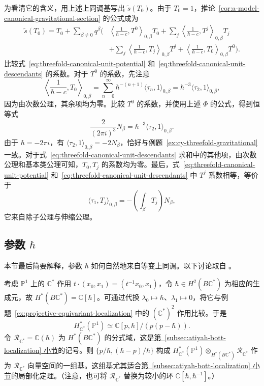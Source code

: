 \begin{example}
为看清它的含义，用上述上同调基写出 $\widetilde s(T_0)$。由于 $T_0=1$，推论~\ref{cor:a-model-canonical-gravitational-section} 的公式成为
\begin{equation}\label{eq:threefold-canonical-unit-descendants}
\begin{aligned}
\widetilde s(T_0)=T_0+\sum_{\beta\ne0}q^\beta\biggl(&
\left\langle\frac1{\hbar-c},T^0\right\rangle_{0,\beta}T_0
+\sum_j\left\langle\frac1{\hbar-c},T^j\right\rangle_{0,\beta}T_j\\
&+\sum_j\left\langle\frac1{\hbar-c},T_j\right\rangle_{0,\beta}T^j
+\left\langle\frac1{\hbar-c},T_0\right\rangle_{0,\beta}T^0\biggr).
\end{aligned}
\end{equation}
比较式~\eqref{eq:threefold-canonical-unit-potential} 和~\eqref{eq:threefold-canonical-unit-descendants} 的系数。对于 $T^0$ 的系数，先注意
\[
\left\langle\frac1{\hbar-c},T_0\right\rangle_{0,\beta}
=\sum_{n=0}^{\infty}\hbar^{-(n+1)}\langle\tau_n,1\rangle_{0,\beta}
=\hbar^{-3}\langle\tau_2,1\rangle_{0,\beta},
\]
因为由次数公理，其余项均为零。比较 $T^0$ 的系数，并使用上述 $\Phi$ 的公式，得到恒等式
\[
\frac2{(2\pi i)^3}N_\beta
=\hbar^{-3}\langle\tau_2,1\rangle_{0,\beta}.
\]
由于 $\hbar=-2\pi i$，有 $\langle\tau_2,1\rangle_{0,\beta}=-2N_\beta$，恰好与例题~\ref{ex:cy-threefold-gravitational} 一致。对于式~\eqref{eq:threefold-canonical-unit-descendants} 求和中的其他项，由次数公理和基本类公理可知，$T_0,T_j$ 的系数均为零。最后，式~\eqref{eq:threefold-canonical-unit-potential} 和~\eqref{eq:threefold-canonical-unit-descendants} 中 $T^j$ 系数相等，等价于
\[
\langle\tau_1,T_j\rangle_{0,\beta}
=-\left(\int_\beta T_j\right)N_\beta,
\]
它来自除子公理与伸缩公理。
\end{example}

\subsection{参数 \texorpdfstring{$\hbar$}{hbar}}\label{subsec:equivariant-giventals-connection}
本节最后简要解释，参数 $\hbar$ 如何自然地来自等变上同调。以下讨论取自 。

考虑 $\mathbb P^1$ 上的 $\mathbb C^*$ 作用 $t\cdot(x_0,x_1)=(t^{-1}x_0,x_1)$，令 $\hbar\in H^2(B\mathbb C^*)$ 为相应的生成元，故 $H^*(B\mathbb C^*)=\mathbb C[\hbar]$。可通过代换 $\lambda_0\mapsto\hbar$、$\lambda_1\mapsto0$，将它与例题~\ref{ex:projective-equivariant-localization} 中的 $(\mathbb C^*)^2$ 作用比较。于是
\[
H_{\mathbb C^*}^*(\mathbb P^1)\simeq\mathbb C[p,\hbar]/(p(p-\hbar)).
\]
令 $\mathcal R_{\mathbb C^*}=\mathbb C(\hbar)$ 为 $H^*(B\mathbb C^*)$ 的分式域，这是\hyperref[subsec:atiyah-bott-localization]{第~\ref*{subsec:atiyah-bott-localization} 小节}的记号。则 $\{p/\hbar,(\hbar-p)/\hbar\}$ 构成 $H_{\mathbb C^*}^*(\mathbb P^1)\otimes_{H^*(B\mathbb C^*)}\mathcal R_{\mathbb C^*}$ 作为 $\mathcal R_{\mathbb C^*}$ 向量空间的一组基。这组基尤其适合\hyperref[subsec:atiyah-bott-localization]{第~\ref*{subsec:atiyah-bott-localization} 小节}的局部化定理。（注意，也可将 $\mathcal R_{\mathbb C^*}$ 替换为较小的环 $\mathbb C[\hbar,\hbar^{-1}]$。）

